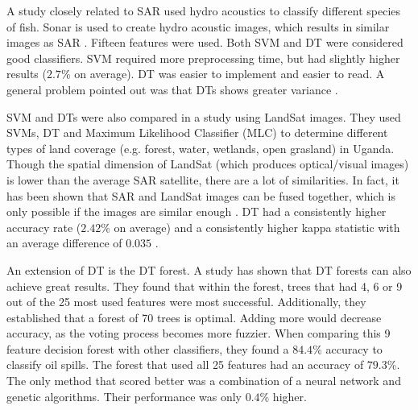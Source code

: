 A study closely related to SAR used hydro acoustics to classify different species of fish. Sonar is used to create hydro acoustic images, which results in similar images as SAR \cite{griffiths2003synthetic}. Fifteen features were used. Both SVM and DT were considered good classifiers. SVM required more preprocessing time, but had slightly higher results ($2.7$\% on average). DT was easier to implement and easier to read. A general problem pointed out was that DTs shows greater variance \cite{Robotham2011170}.

SVM and DTs were also compared in a study using LandSat images. They used SVMs, DT and Maximum Likelihood Classifier (MLC) to determine different types of land coverage (e.g. forest, water, wetlands, open grasland) in Uganda. Though the spatial dimension of LandSat (which produces optical/visual images) is lower than the average SAR satellite, there are a lot of similarities. In fact, it has been shown that SAR and LandSat images can be fused together, which is only possible if the images are similar enough \cite{dupas2000sar}. DT had a consistently higher accuracy rate ($2.42$\% on average) and a consistently higher kappa statistic with an average difference of $0.035$ \cite{Otukei2010S27}.

An extension of DT is the DT forest. A study \cite{Topouzelis201268} has shown that DT forests can also achieve great results. They found that within the forest, trees that had 4, 6 or 9 out of the 25 most used features were most successful. Additionally, they established that a forest of 70 trees is optimal. Adding more would decrease accuracy, as the voting process becomes more fuzzier. When comparing this 9 feature decision forest with other classifiers, they found a $84.4$\% accuracy to classify oil spills. The forest that used all 25 features had an accuracy of $79.3$\%. The only method that scored better was a combination of a neural network and genetic algorithms. Their performance was only $0.4$\% higher.